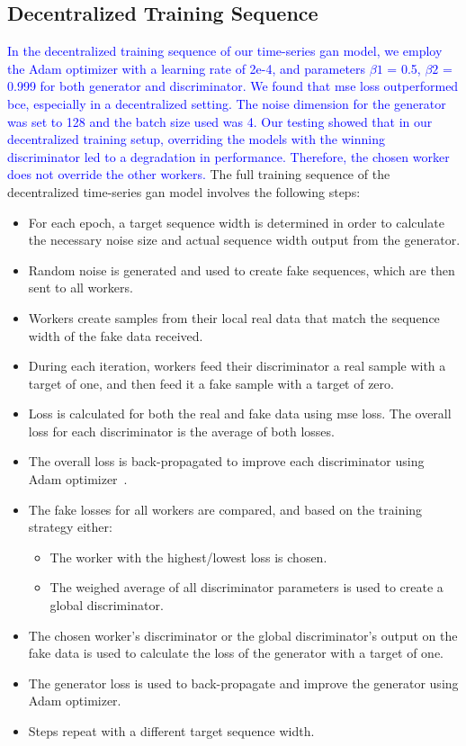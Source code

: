 \subsection{Decentralized Training Sequence}
%
\textcolor{blue}{In the decentralized training sequence of our time-series \gls*{gan} model, we employ the Adam optimizer with a learning rate of 2e-4, and parameters $\beta1$ = 0.5, $\beta2$ = 0.999 for both generator and discriminator. We found that \gls*{mse} loss outperformed \gls*{bce}, especially in a decentralized setting. The noise dimension for the generator was set to 128 and the batch size used was 4. Our testing showed that in our decentralized training setup, overriding the models with the winning discriminator led to a degradation in performance. Therefore, the chosen worker does not override the other workers.} The full training sequence of the decentralized time-series \gls*{gan} model involves the following steps:
%
\begin{itemize}
\item For each epoch, a target sequence width is determined in order to calculate the necessary noise size and actual sequence width output from the generator.
\item Random noise is generated and used to create fake sequences, which are then sent to all workers.
\item Workers create samples from their local real data that match the sequence width of the fake data received.
\item During each iteration, workers feed their discriminator a real sample with a target of one, and then feed it a fake sample with a target of zero.
\item Loss is calculated for both the real and fake data using \gls*{mse} loss. The overall loss for each discriminator is the average of both losses.
\item The overall loss is back-propagated to improve each discriminator using Adam optimizer~\cite{adam_optimizer}.
\item The fake losses for all workers are compared, and based on the training strategy either:
\begin{itemize}
\item The worker with the highest/lowest loss is chosen.
\item The weighed average of all discriminator parameters is used to create a global discriminator. %
\end{itemize}
\item The chosen worker's discriminator or the global discriminator's output on the fake data is used to calculate the loss of the generator with a target of one.
\item The generator loss is used to back-propagate and improve the generator using Adam optimizer.
\item Steps repeat with a different target sequence width.
\end{itemize}


